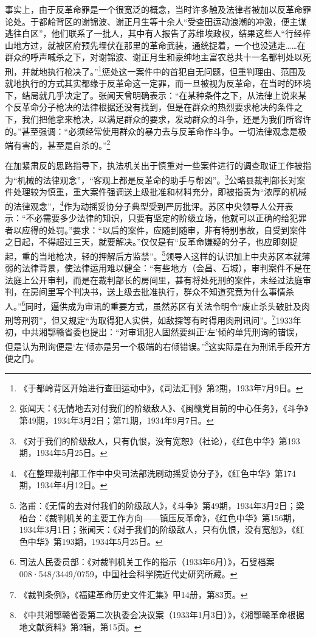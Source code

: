 事实上，由于反革命罪是一个很宽泛的概念，当时许多触及法律者被加以反革命罪论处。于都岭背区的谢锦波、谢正月生等十余人“受查田运动浪潮的冲激，便主谋逃往白区”，他们联系了一批人，其中有人报告了苏维埃政权，结果这些人“行经梓山地方过，就被区府预先埋伏在那里的革命武装，通统捉着，一个也没逃走……在群众的呼声喊杀之下，对谢锦波、谢正月生和豪绅地主富农总共十一名都判处以死刑，并就地执行枪决了。”\footnote{《于都岭背区开始进行查田运动中》，《司法汇刊》第2期，1933年7月9日。}惩处这一案件中的首犯自无问题，但重判理由、范围及就地执行的方式其实都缘于反革命这一定罪，而一旦被视为反革命，在当时的环境下，结局就几乎决定了。张闻天曾明确表示：“在某种条件之下，从法律上说来某个反革命分子枪决的法律根据还没有找到，但是在群众的热烈要求枪决的条件之下，我们把他拿来枪决，以满足群众的要求，发动群众的斗争，还是为我们所容许的。”甚至强调：“必须经常使用群众的暴力去与反革命作斗争。一切法律观念是极端有害的，甚至是自杀的。”\footnote{张闻天：《无情地去对付我们的阶级敌人》、《闽赣党目前的中心任务》，《斗争》第49期，1934年3月2日；第71期，1934年9月7日。}


在加紧肃反的思路指导下，执法机关出于慎重对一些案件进行的调查取证工作被指为“机械的法律观念”，“客观上都是反革命的助手与帮凶”。\footnote{《对于我们的阶级敌人，只有仇恨，没有宽恕》（社论），《红色中华》第193期，1934年5月25日。}公略县裁判部长对案件处理较为慎重，重大案件强调送上级批准和材料充分，即被指责为“浓厚的机械的法律观念”，\footnote{《在整理裁判部工作中中央司法部洗刷动摇妥协分子》，《红色中华》第174期，1934年4月12日。}作为动摇妥协分子典型受到严厉批评。苏区中央领导人公开表示：“不必需要多少法律的知识，只要有坚定的阶级立场，他就可以正确的给犯罪者以应得的处罚。”要求：“以后的案件，应随到随审，非有特别事故，自受到案件之日起，不得超过三天，就要解决。”仅仅是有“反革命嫌疑的分子，也应即刻捉起，重的当地枪决，轻的押解后方监禁”。\footnote{洛甫：《无情的去对付我们的阶级敌人》，《斗争》第49期，1934年3月2日；梁柏台：《裁判机关的主要工作方向——镇压反革命》，《红色中华》第156期，1934年3月1日；张闻天：《对于我们的阶级敌人，只有仇恨，没有宽恕》，《红色中华》第193期，1934年5月25日。}领导人这样的认识加上中央苏区本就薄弱的法律背景，使法律运用难以健全：“有些地方（会昌、石城），审判案件不是在法庭上公开审判，而是在裁判部长的房间里，甚有将处死刑的案件，未经过法庭审判，在房间里写个判决书，送上级去批准执行，群众不知道究竟为什么事情杀人。”\footnote{司法人民委员部：《对裁判机关工作的指示（1933年6月）》，石叟档案008·548/3449/0759，中国社会科学院近代史研究所藏。}同时，逼供成为审讯的重要方式，虽然苏区有关法令明令“废止杀头破肚及肉刑等刑罚”，但又规定“为取得犯人实供，如敌探等有时得用肉刑讯问”。\footnote{《裁判条例》，《福建革命历史文件汇集》甲14册，第83页。}1933年初，中共湘鄂赣省委也提出：“对审讯犯人固然要纠正‘左’倾的单凭刑询的错误，但是认为刑询便是‘左’倾亦是另一个极端的右倾错误。”\footnote{《中共湘鄂赣省委第二次执委会决议案（1933年1月3日）》，《湘鄂赣革命根据地文献资料》第2辑，第15页。}这实际是在为刑讯手段开方便之门。


